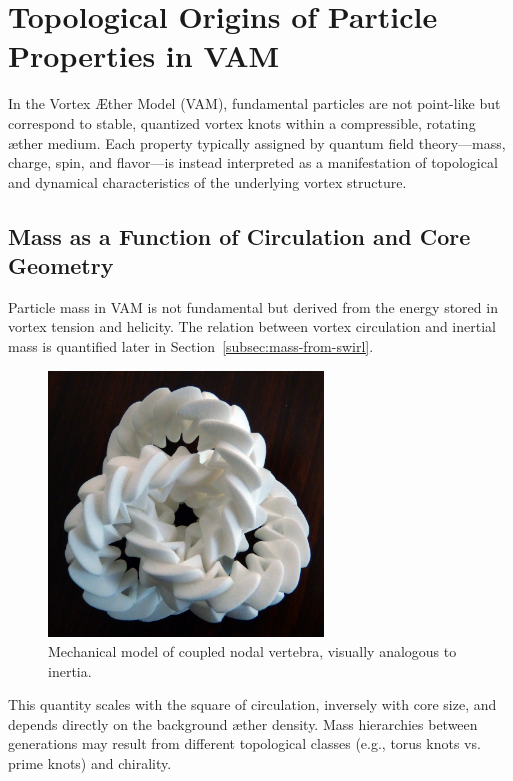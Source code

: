 \section{Topological Origins of Particle Properties in VAM}

In the Vortex Æther Model (VAM), fundamental particles are not point-like but correspond to stable, quantized vortex knots within a compressible, rotating æther medium. Each property typically assigned by quantum field theory---mass, charge, spin, and flavor---is instead interpreted as a manifestation of topological and dynamical characteristics of the underlying vortex structure.

\subsection{Mass as a Function of Circulation and Core Geometry}

Particle mass in VAM is not fundamental but derived from the energy stored in vortex tension and helicity. The relation between vortex circulation and inertial mass is quantified later in Section~\ref{subsec:mass-from-swirl}.

\begin{figure}[h!]
\centering
\includegraphics[width=0.65\textwidth]{mechanic_trefoil}
\caption{Mechanical model of coupled nodal vertebra, visually analogous to inertia.}
\end{figure}

This quantity scales with the square of circulation, inversely with core size, and depends directly on the background æther density. Mass hierarchies between generations may result from different topological classes (e.g., torus knots vs. prime knots) and chirality.

